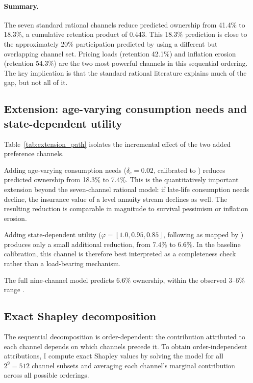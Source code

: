 \documentclass[12pt]{article}
\begin{document}
\paragraph{Summary.} The seven standard rational channels reduce predicted ownership from 41.4\% to 18.3\%, a cumulative retention product of 0.443. This 18.3\% prediction is close to the approximately 20\% participation predicted by \citet{pashchenko2013} using a different but overlapping channel set. Pricing loads (retention 42.1\%) and inflation erosion (retention 54.3\%) are the two most powerful channels in this sequential ordering. The key implication is that the standard rational literature explains much of the gap, but not all of it.

\subsection{Extension: age-varying consumption needs and state-dependent utility}
\label{sec:extension}

Table~\ref{tab:extension_path} isolates the incremental effect of the two added preference channels.



Adding age-varying consumption needs ($\delta_c = 0.02$, calibrated to \citealp{aguiarhurst2013}) reduces predicted ownership from 18.3\% to 7.4\%. This is the quantitatively important extension beyond the seven-channel rational model: if late-life consumption needs decline, the insurance value of a level annuity stream declines as well. The resulting reduction is comparable in magnitude to survival pessimism or inflation erosion.

Adding state-dependent utility ($\varphi = [1.0, 0.95, 0.85]$, following \citealp{finkelsteinluttmer2013} as mapped by \citealp{reichlingsmetters2015}) produces only a small additional reduction, from 7.4\% to 6.6\%. In the baseline calibration, this channel is therefore best interpreted as a completeness check rather than a load-bearing mechanism.

The full nine-channel model predicts 6.6\% ownership, within the observed 3--6\% range \citep{lockwood2012, dushiwebb2004}.

\subsection{Exact Shapley decomposition}
\label{sec:shapley}

The sequential decomposition is order-dependent: the contribution attributed to each channel depends on which channels precede it. To obtain order-independent attributions, I compute exact Shapley values by solving the model for all $2^9 = 512$ channel subsets and averaging each channel's marginal contribution across all possible orderings.
\end{document}
